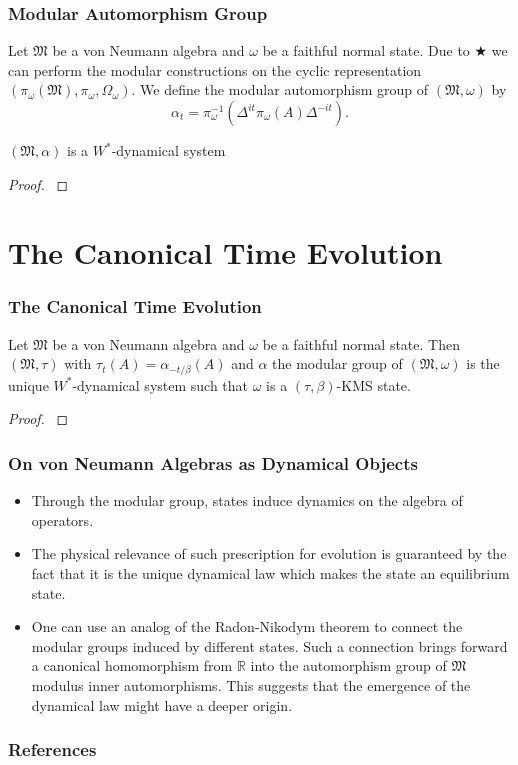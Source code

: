 \documentclass{beamer}
\begin{document}
\begin{frame}
	\frametitle{Modular Automorphism Group}
	\begin{definition}
		Let $\mathfrak{M}$ be a von Neumann algebra and $\omega$ be a faithful normal state. Due to $\bigstar$ we can perform the modular constructions on the cyclic representation $(\pi_\omega(\mathfrak{M}),\pi_\omega,\Omega_\omega)$. We define the modular automorphism group of $(\mathfrak{M},\omega)$ by 
		\begin{equation}
			\alpha_t=\pi_\omega^{-1}(\Delta^{it}\pi_\omega(A)\Delta^{-it}).
		\end{equation}
	\end{definition}
	\begin{theorem}[$\bigstar\bigstar$]
		$(\mathfrak{M},\alpha)$ is a $W^*$-dynamical system  
	\end{theorem}		
	\begin{proof}
		\cite{Duvenhage1999}
	\end{proof}
\end{frame}

\section{The Canonical Time Evolution}

\begin{frame}
	\frametitle{The Canonical Time Evolution}
	\begin{theorem}[$\bigstar\bigstar\bigstar$]
		Let $\mathfrak{M}$ be a von Neumann algebra and $\omega$ be a faithful normal state. Then $(\mathfrak{M},\tau)$ with $\tau_t(A) = \alpha_{-t/\beta}(A)$ and $\alpha$ the modular group of $(\mathfrak{M},\omega)$ is the unique $W^*$-dynamical system such that $\omega$ is a $(\tau,\beta)$-KMS state.
	\end{theorem}
	\begin{proof}
		\cite{Duvenhage1999}
	\end{proof}
\end{frame}

\begin{frame}
	\frametitle{On von Neumann Algebras as Dynamical Objects}
	\begin{itemize}
		\item Through the modular group, states induce dynamics on the algebra of operators.
		\item The physical relevance of such prescription for evolution is guaranteed by the fact that it is the unique  dynamical law which makes the state an equilibrium state.
		\item One can use an analog of the Radon-Nikodym theorem to connect the modular groups induced by different states. Such a connection brings forward a canonical  homomorphism from $\mathbb{R}$ into the automorphism group of $\mathfrak{M}$ modulus inner automorphisms. This suggests that the emergence of the dynamical law might have a deeper origin.  
	\end{itemize}
\end{frame}

\begin{frame}[allowframebreaks]
	\frametitle{References}
	
	
\end{frame}
\end{document}
